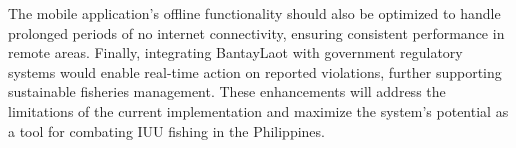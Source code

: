 \documentclass{icsthesis}
\begin{document}
\begin{mainmatter}
            The mobile application’s offline functionality should also be optimized to handle prolonged periods of no internet connectivity, ensuring consistent performance in remote areas. Finally, integrating BantayLaot with government regulatory systems would enable real-time action on reported violations, further supporting sustainable fisheries management. These enhancements will address the limitations of the current implementation and maximize the system’s potential as a tool for combating IUU fishing in the Philippines.

			
	\end{mainmatter}
\end{document}
